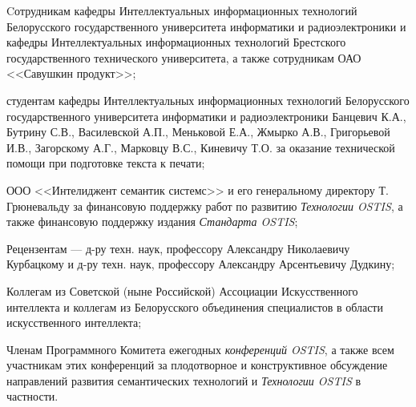 \begin{SCn}
{\begin{scnitemize}
	\item Cотрудникам кафедры Интеллектуальных информационных технологий Белорусского государственного университета информатики и радиоэлектроники и кафедры Интеллектуальных информационных технологий Брестского государственного технического университета, а также сотрудникам ОАО <<Савушкин продукт>>;
	\item студентам кафедры Интеллектуальных информационных технологий Белорусского государственного университета информатики и радиоэлектроники Банцевич К.А., Бутрину С.В., Василевской А.П., Меньковой Е.А., Жмырко А.В., Григорьевой И.В., Загорскому А.Г., Марковцу В.С., Киневичу Т.О. за оказание технической помощи при подготовке текста к печати;
	\item ООО <<Интелиджент семантик системс>> и его генеральному директору Т. Грюневальду за финансовую поддержку работ по развитию \textit{Технологии OSTIS}, а также финансовую поддержку издания \textit{Стандарта OSTIS};
	\item Рецензентам --- д-ру техн. наук, профессору Александру Николаевичу Курбацкому и д-ру техн. наук, профессору Александру Арсентьевичу Дудкину;
	\item Коллегам из Советской (ныне Российской) Ассоциации Искусственного интеллекта и коллегам из Белорусского объединения специалистов в области искусственного интеллекта;
	\item Членам Программного Комитета ежегодных \textit{конференций OSTIS}, а также всем участникам этих конференций за плодотворное и конструктивное обсуждение направлений развития семантических технологий и \textit{Технологии OSTIS} в частности.
\end{scnitemize}}

\newpage

\end{SCn}